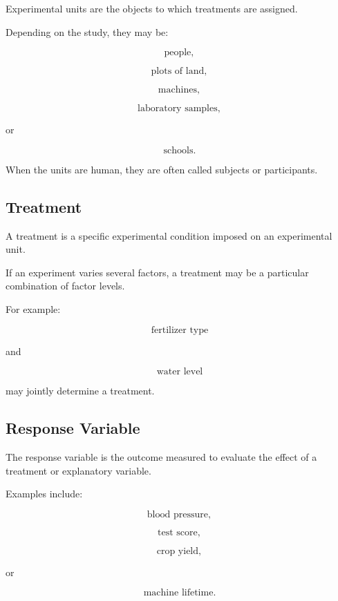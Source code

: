 Experimental units are the objects to which treatments are assigned.

Depending on the study, they may be:

\[
\text{people},
\]

\[
\text{plots of land},
\]

\[
\text{machines},
\]

\[
\text{laboratory samples},
\]

or

\[
\text{schools}.
\]

When the units are human, they are often called subjects or participants.

\subsection{Treatment}
\label{subsec:treatment}

A treatment is a specific experimental condition imposed on an
experimental unit.

If an experiment varies several factors, a treatment may be a particular
combination of factor levels.

For example:

\[
\text{fertilizer type}
\]

and

\[
\text{water level}
\]

may jointly determine a treatment.

\subsection{Response Variable}
\label{subsec:response-variable}

The response variable is the outcome measured to evaluate the effect of
a treatment or explanatory variable.

Examples include:

\[
\text{blood pressure},
\]

\[
\text{test score},
\]

\[
\text{crop yield},
\]

or

\[
\text{machine lifetime}.
\]

